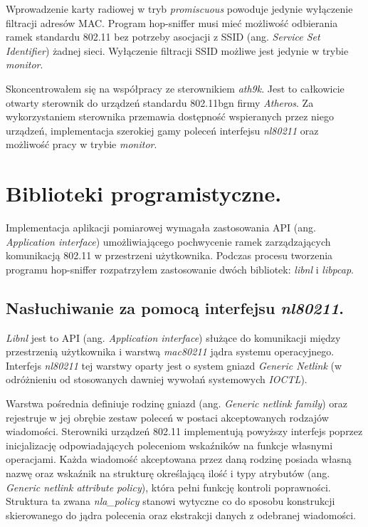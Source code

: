 Wprowadzenie karty radiowej w tryb \emph{promiscuous} powoduje jedynie wyłączenie filtracji adresów MAC. Program hop-sniffer musi mieć możliwość odbierania ramek standardu 802.11 bez potrzeby asocjacji z SSID (ang. \emph{Service Set Identifier}) żadnej sieci. Wyłączenie filtracji SSID możliwe jest jedynie w trybie \emph{monitor}.

Skoncentrowałem się na współpracy ze sterownikiem \emph{ath9k}. Jest to całkowicie otwarty sterownik do urządzeń standardu 802.11bgn firmy \emph{Atheros}. Za wykorzystaniem sterownika przemawia dostępność wspieranych przez niego urządzeń, implementacja szerokiej gamy poleceń interfejsu \emph{nl80211} oraz możliwość pracy w trybie \emph{monitor}.

\section{Biblioteki programistyczne.}

Implementacja aplikacji pomiarowej wymagała zastosowania API (ang. \emph{Application interface}) umożliwiającego pochwycenie ramek zarządzających komunikacją 802.11 w przestrzeni użytkownika. Podczas procesu tworzenia programu hop-sniffer rozpatrzyłem zastosowanie dwóch bibliotek: \emph{libnl} i \emph{libpcap}.

\subsection{Nasłuchiwanie za pomocą interfejsu \emph{nl80211}.}

\emph{Libnl} jest to API (ang. \emph{Application interface}) służące do komunikacji między przestrzenią użytkownika i warstwą \emph{mac80211} jądra systemu operacyjnego. Interfejs \emph{nl80211} tej warstwy oparty jest o system gniazd \emph{Generic Netlink} (w odróżnieniu od stosowanych dawniej wywołań systemowych \emph{IOCTL}).  

Warstwa pośrednia definiuje rodzinę gniazd (ang. \emph{Generic netlink family}) oraz rejestruje w jej obrębie zestaw poleceń w postaci akceptowanych rodzajów wiadomości. Sterowniki urządzeń 802.11 implementują powyższy interfejs poprzez inicjalizację odpowiadających poleceniom wskaźników na funkcje własnymi operacjami. Każda wiadomość akceptowana przez daną rodzinę posiada własną nazwę oraz wskaźnik na strukturę określającą ilość i typy atrybutów (ang. \emph{Generic netlink attribute policy}), która pełni funkcję kontroli poprawności. Struktura ta zwana \emph{nla\_policy} stanowi wytyczne co do sposobu konstrukcji skierowanego do jądra polecenia oraz ekstrakcji danych z odebranej wiadomości.

